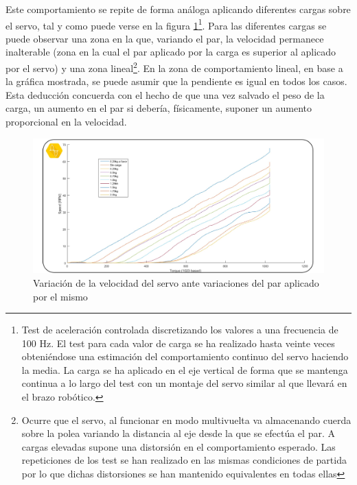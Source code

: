 Este comportamiento se repite de forma análoga aplicando diferentes cargas sobre el servo, tal y como puede verse en la figura \ref{fig:Control:control_velocidad_par_2}\footnote{Test de aceleración controlada discretizando los valores a una frecuencia de 100 Hz. El test para cada valor de carga se ha realizado hasta veinte veces obteniéndose una estimación del comportamiento continuo del servo haciendo la media. La carga se ha aplicado en el eje vertical de forma que se mantenga continua a lo largo del test con un montaje del servo similar al que llevará en el brazo robótico.}. Para las diferentes cargas se puede observar una zona en la que, variando el par, la velocidad permanece inalterable (zona en la cual el par aplicado por la carga es superior al aplicado por el servo) y una zona lineal\footnote{Ocurre que el servo, al funcionar en modo multivuelta va almacenando cuerda sobre la polea variando la distancia al eje desde la que se efectúa el par. A cargas elevadas supone una distorsión en el comportamiento esperado. Las repeticiones de los test se han realizado en las mismas condiciones de partida por lo que dichas distorsiones se han mantenido equivalentes en todas ellas}. En la zona de comportamiento lineal, en base a la gráfica mostrada, se puede asumir que la pendiente es igual en todos los casos. Esta deducción concuerda con el hecho de que una vez salvado el peso de la carga, un aumento en el par si debería, físicamente, suponer un aumento proporcional en la velocidad.
\\

\begin{figure}
    \centering
    \includegraphics[width=1\textwidth]{figuras/Imagenes_Control/Control_2.jpg}
    \caption{Variación de la velocidad del servo ante variaciones del par aplicado por el mismo}
    \label{fig:Control:control_velocidad_par_2}
\end{figure}

